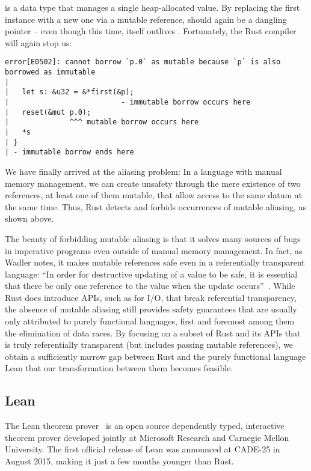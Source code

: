  is a data type that manages a single heap-allocated value. By
replacing the first  instance with a new one via a mutable reference,
 should again be a dangling pointer -- even though this time,  itself
outlives . Fortunately, the Rust compiler will again stop us:

\begin{verbatim}
error[E0502]: cannot borrow `p.0` as mutable because `p` is also borrowed as immutable
|
|   let s: &u32 = &*first(&p);
|                          - immutable borrow occurs here
|   reset(&mut p.0);
|              ^^^ mutable borrow occurs here
|   *s
| }
| - immutable borrow ends here
\end{verbatim}

We have finally arrived at the aliasing problem: In a language with manual
memory management, we can create unsafety through the mere existence of two
references, at least one of them mutable, that allow access to the same
datum at the same time. Thus, Rust detects
and forbids occurrences of mutable aliasing, as shown above.

The beauty of forbidding mutable aliasing is that it solves many sources of bugs
in imperative programs even outside of manual memory management. In fact, as
Wadler notes, it makes mutable references safe even in a referentially
transparent language: ``In order for destructive updating of a value to be safe,
it is essential that there be only one reference to the value when the update
occurs''~\cite{wadler1990linear}. While Rust does introduce APIs, such as for I/O, that break referential
transparency, the absence of mutable aliasing still provides safety guarantees
that are usually only attributed to purely functional languages, first and
foremost among them the elimination of data races. By focusing on a subset of
Rust and its APIs that is truly referentially transparent (but includes passing mutable references), we obtain a
sufficiently narrow gap between Rust and the purely functional language Lean
that our transformation between them becomes feasible.

\subsection{Lean}

The Lean theorem prover~\cite{de2015lean} is an open source dependently typed,
interactive theorem prover developed jointly at Microsoft Research and Carnegie
Mellon University. The first official release of Lean was announced at CADE-25
in August 2015, making it just a few months younger than Rust.

